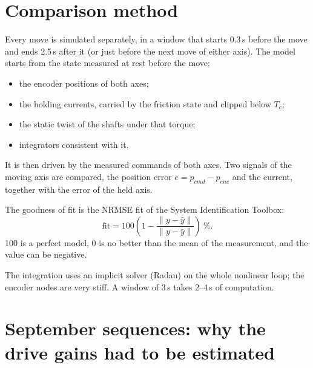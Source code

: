 \documentclass[10pt,a4paper]{article}
\numberwithin{equation}{section}
\begin{document}
\section{Comparison method}\label{sec:method}
Every move is simulated separately, in a window that starts 0.3\,s before the move and ends 2.5\,s after it (or just before the next move of either axis). The model starts from the state measured at rest before the move:
\begin{itemize}
\item the encoder positions of both axes;
\item the holding currents, carried by the friction state and clipped below $T_c$;
\item the static twist of the shafts under that torque;
\item integrators consistent with it.
\end{itemize}
It is then driven by the measured commands of both axes. Two signals of the moving axis are compared, the position error $e=p_{cmd}-p_{enc}$ and the current, together with the error of the held axis.

The goodness of fit is the NRMSE fit of the System Identification Toolbox:
\begin{equation}
\mathrm{fit}=100\left(1-\frac{\lVert y-\hat y\rVert}{\lVert y-\bar y\rVert}\right)\ \%.
\end{equation}
100 is a perfect model, 0 is no better than the mean of the measurement, and the value can be negative.

The integration uses an implicit solver (Radau) on the whole nonlinear loop; the encoder nodes are very stiff. A window of 3\,s takes 2--4\,s of computation.

\section{September sequences: why the drive gains had to be estimated}\label{sec:sep}
\end{document}

